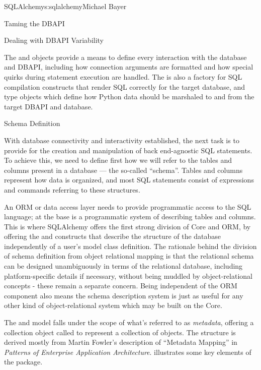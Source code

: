 \begin{aosachapter}{SQLAlchemy}{s:sqlalchemy}{Michael Bayer}
\begin{aosasect1}{Taming the DBAPI}
\begin{aosasect2}{Dealing with DBAPI Variability}

The  and  objects provide a means
to define every interaction with the database and DBAPI,
including how connection arguments are formatted and how special
quirks during statement execution are handled. The 
is also a factory for SQL compilation constructs that render
SQL correctly for the target database, and type objects which
define how Python data should be marshaled to and from the target
DBAPI and database.

\end{aosasect2}

\end{aosasect1}

\begin{aosasect1}{Schema Definition}

With database connectivity and interactivity established, the next task
is to provide for the creation and manipulation of back end-agnostic
SQL statements.  To achieve this, we need to define first how we will
refer to the tables and columns present in a database --- the so-called
``schema''.  Tables and columns represent how data
is organized, and most SQL statements consist of expressions and
commands referring to these structures.

An ORM or data access layer needs to provide programmatic access to the SQL
language; at the base is a programmatic system of describing tables and
columns. This is where SQLAlchemy offers the first strong division of Core
and ORM, by offering the  and  constructs that describe
the structure of the database independently of a user's model class
definition.  The rationale behind the division of schema definition from object
relational mapping is that the relational schema can be designed
unambiguously in terms of the relational database, including platform-specific
details if necessary, without being muddled by object-relational concepts -
these remain a separate concern. Being independent of the ORM component also
means the schema description system is just as useful for any other kind of
object-relational system which may be built on the Core.

The  and  model falls under the scope of what's
referred to as \emph{metadata}, offering a collection object called  to represent
a collection of  objects.  The structure is derived
mostly from Martin Fowler's description of ``Metadata Mapping'' in
\emph{Patterns of Enterprise Application Architecture}. %
 illustrates
some key elements of the  package.


\end{aosasect1}
\end{aosachapter}
